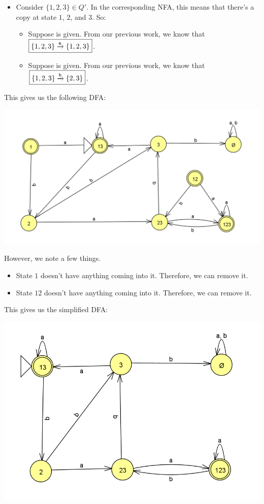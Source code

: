 \documentclass[letterpaper]{article}
\begin{document}
\begin{itemize}
    \item Consider $\{1, 2, 3\} \in Q'$. In the corresponding NFA, this means that there's a copy at state $1$, $2$, and $3$. So: 
    \begin{itemize}
        \item Suppose  is given. From our previous work, we know that $\boxed{\{1, 2, 3\} \xrightarrow{\texttt{a}} \{1, 2, 3\}}$.
        \item Suppose  is given. From our previous work, we know that $\boxed{\{1, 2, 3\} \xrightarrow{\texttt{b}} \{2, 3\}}$.
    \end{itemize}
\end{itemize}

This gives us the following DFA: 
\begin{center}
    \includegraphics[scale=0.50]{assets/nfa_to_dfa_2.png}
\end{center}

However, we note a few things.
\begin{itemize}
    \item State $1$ doesn't have anything coming into it. Therefore, we can remove it.
    \item State $12$ doesn't have anything coming into it. Therefore, we can remove it.
\end{itemize}
This gives us the simplified DFA: 
\begin{center}
    \includegraphics[scale=0.50]{assets/nfa_to_dfa_3.png}
\end{center}
\end{document}
